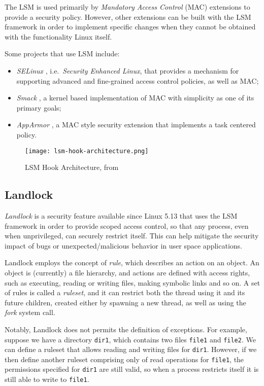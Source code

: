 The LSM is used primarily by \textit{Mandatory Access Control} (MAC) extensions to
provide a security policy. However, other extensions can be built with the LSM framework
in order to implement specific changes when they cannot be obtained with the functionality Linux itself.

Some projects that use LSM include:
\begin{itemize}
  \item \textit{SELinux} \cite{selinux}, i.e.\ \textit{Security Enhanced Linux}, that provides a mechanism for supporting advanced and fine-grained access control policies, as well as MAC;
  \item \textit{Smack} \cite{smack}, a kernel based implementation of MAC with simplicity as one of its primary goals;
  \item \textit{AppArmor} \cite{apparmor}, a MAC style security extension that implements a task centered policy.
\end{itemize}

\begin{figure}[h]
  \centering
  \texttt{[image: lsm-hook-architecture.png]}
  \caption{LSM Hook Architecture, from \cite{kernel-lsm}}
  \label{fig:lsm-hook-architecture}
\end{figure}

\subsection{Landlock}
\textit{Landlock} \cite{landlock-kernel} \cite{landlock-user-space} is a security feature available since Linux 5.13
that uses the LSM framework in order to provide scoped access control,
so that any process, even when unprivileged, can securely restrict itself.
This can help mitigate the security impact of bugs or unexpected/malicious behavior
in user space applications.

Landlock employs the concept of \textit{rule}, which describes an action
on an object. An object is (currently) a file hierarchy, and actions are
defined with access rights, such as executing, reading or writing files, making
symbolic links and so on.
A set of rules is called a \textit{ruleset}, and it can restrict both the thread
using it and its future children, created either by spawning a new thread, as well
as using the \textit{fork} system call.

Notably, Landlock does not permits the definition of exceptions.
For example, suppose we have a directory \texttt{dir1}, which contains two files
\texttt{file1} and \texttt{file2}. We can define a ruleset that allows
reading and writing files for \texttt{dir1}.
However, if we then define another ruleset comprising only of read operations
for \texttt{file1}, the permissions specified for \texttt{dir1} are still
valid, so when a process restricts itself it is still able to write to \texttt{file1}.

